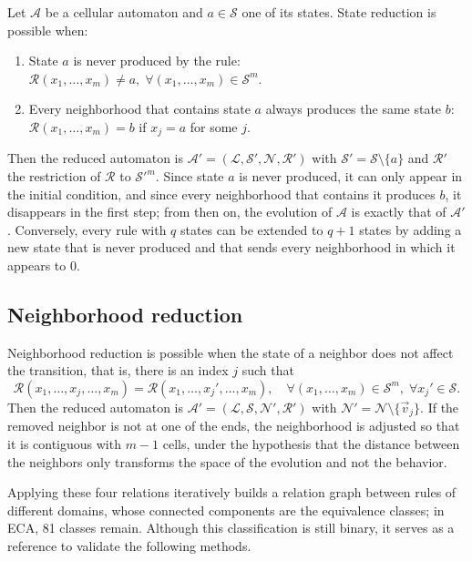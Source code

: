 Let $\mathcal{A}$ be a cellular automaton and $a \in \mathcal{S}$ one of its states. State reduction is possible when:
\begin{enumerate}
    \item State $a$ is never produced by the rule: $\mathcal{R}(x_1, \dots, x_m) \neq a, \; \forall (x_1, \dots, x_m) \in \mathcal{S}^m$.
    \item Every neighborhood that contains state $a$ always produces the same state $b$: $\mathcal{R}(x_1, \dots, x_m) = b$ if $x_j = a$ for some $j$.
\end{enumerate}
Then the reduced automaton is $\mathcal{A}' = (\mathcal{L}, \mathcal{S}', \mathcal{N}, \mathcal{R}')$ with $\mathcal{S}' = \mathcal{S} \setminus \{a\}$ and $\mathcal{R}'$ the restriction of $\mathcal{R}$ to $\mathcal{S}'^m$. Since state $a$ is never produced, it can only appear in the initial condition, and since every neighborhood that contains it produces $b$, it disappears in the first step; from then on, the evolution of $\mathcal{A}$ is exactly that of $\mathcal{A}'$. Conversely, every rule with $q$ states can be extended to $q + 1$ states by adding a new state that is never produced and that sends every neighborhood in which it appears to 0.

\subsection{Neighborhood reduction}

Neighborhood reduction is possible when the state of a neighbor does not affect the transition, that is, there is an index $j$ such that
\[
\mathcal{R}(x_1, \dots, x_j, \dots, x_m) = \mathcal{R}(x_1, \dots, x_j', \dots, x_m), \quad \forall (x_1, \dots, x_m) \in \mathcal{S}^m, \; \forall x_j' \in \mathcal{S}.
\]
Then the reduced automaton is $\mathcal{A}' = (\mathcal{L}, \mathcal{S}, \mathcal{N}', \mathcal{R}')$ with $\mathcal{N}' = \mathcal{N} \setminus \{\vec{v}_j\}$. If the removed neighbor is not at one of the ends, the neighborhood is adjusted so that it is contiguous with $m - 1$ cells, under the hypothesis that the distance between the neighbors only transforms the space of the evolution and not the behavior.

Applying these four relations iteratively builds a relation graph between rules of different domains, whose connected components are the equivalence classes; in ECA, 81 classes remain. Although this classification is still binary, it serves as a reference to validate the following methods.
